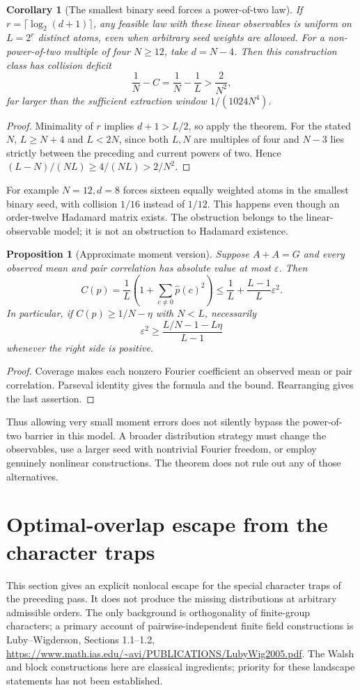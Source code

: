 \documentclass[11pt]{article}
\newtheorem{corollary}[theorem]{Corollary}
\newtheorem{proposition}[theorem]{Proposition}
\begin{document}
\begin{corollary}[The smallest binary seed forces a power-of-two law]
\label{cor:minimum-seed}
If $r=\lceil\log_2(d+1)\rceil$, any feasible law with these linear
observables is uniform on $L=2^r$ distinct atoms, even when arbitrary
seed weights are allowed.
For a non-power-of-two multiple of four $N\ge12$, take $d=N-4$.
Then this construction class has collision deficit
\[
 \frac1N-C=\frac1N-\frac1L>\frac2{N^2},
\]
far larger than the sufficient extraction window $1/(1024N^4)$.
\end{corollary}
\begin{proof}
Minimality of $r$ implies $d+1>L/2$, so apply the theorem.
For the stated $N$, $L\ge N+4$ and $L<2N$, since both $L,N$ are
multiples of four and $N-3$ lies strictly between the preceding and
current powers of two. Hence
$(L-N)/(NL)\ge4/(NL)>2/N^2$.
\end{proof}
For example $N=12,d=8$ forces sixteen equally weighted atoms in the
smallest binary seed, with collision $1/16$ instead of $1/12$.
This happens even though an order-twelve Hadamard matrix exists.
The obstruction belongs to the linear-observable model; it is not
an obstruction to Hadamard existence.

\begin{proposition}[Approximate moment version]\label{prop:approx-character}
Suppose $A+A=G$ and every observed mean and pair correlation has
absolute value at most $\varepsilon$. Then
\[
 C(p)=\frac1L\left(1+\sum_{c\ne0}\widehat p(c)^2\right)
 \le\frac1L+\frac{L-1}{L}\varepsilon^2.
\]
In particular, if $C(p)\ge1/N-\eta$ with $N<L$, necessarily
\[
 \varepsilon^2\ge
 \frac{L/N-1-L\eta}{L-1}
\]
whenever the right side is positive.
\end{proposition}
\begin{proof}
Coverage makes each nonzero Fourier coefficient an observed mean or
pair correlation. Parseval identity gives the formula and the bound.
Rearranging gives the last assertion.
\end{proof}
Thus allowing very small moment errors does not silently bypass the
power-of-two barrier in this model. A broader distribution strategy
must change the observables, use a larger seed with nontrivial Fourier
freedom, or employ genuinely nonlinear constructions. The theorem
does not rule out any of those alternatives.
\section{Optimal-overlap escape from the character traps}
\label{sec:compression-escape}
This section gives an explicit nonlocal escape for the special character
traps of the preceding pass. It does not produce the missing distributions
at arbitrary admissible orders. The only background is orthogonality of
finite-group characters; a primary account of pairwise-independent finite
field constructions is Luby--Wigderson, Sections 1.1--1.2,
\url{https://www.math.ias.edu/~avi/PUBLICATIONS/LubyWig2005.pdf}.
The Walsh and block constructions here are classical ingredients; priority
for these landscape statements has not been established.
\end{document}
